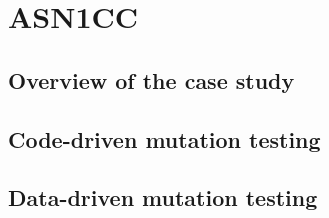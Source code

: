 
\section{ASN1CC}
\label{sec:caseStudies:GSL:ASN1}

\subsection{Overview of the case study}



\subsection{Code-driven mutation testing}


\subsection{Data-driven mutation testing}







